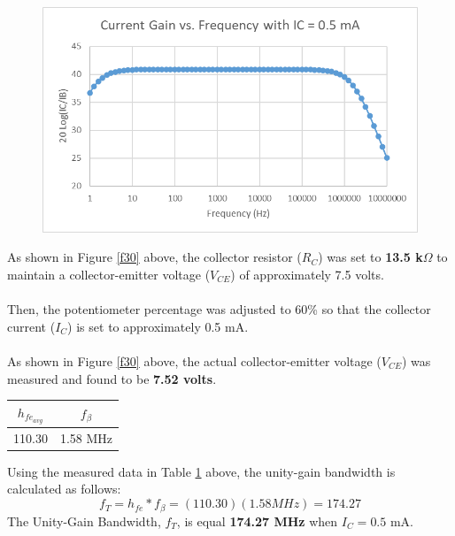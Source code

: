 \documentclass{article}
\begin{document}
	\pagebreak
	
	\begin{figure}[!ht]
		\centering
		\includegraphics[width=0.6\linewidth]{part4-currentGain-0.5ma.png}
		\label{f32}
	\end{figure}
	
	\noindent As shown in Figure \ref{f30} above, the collector resistor ($R_C$) was set to \textbf{13.5 k$\Omega$} to maintain a collector-emitter voltage ($V_{CE}$) of approximately 7.5 volts.\\\\
	Then, the potentiometer percentage was adjusted to 60\% so that the collector current ($I_C$) is set to approximately 0.5 mA.\\\\
	As shown in Figure \ref{f30} above, the actual collector-emitter voltage ($V_{CE}$) was measured and found to be \textbf{7.52 volts}.
	
	\begin{table}[!ht]
		\centering
		\label{t12}
		\begin{tabular}{|c|c|}
			\hline
			$h_{fe_{avg}}$ & $f_{\beta}$\\
			\hline\hline
			110.30 & 1.58 MHz\\
			\hline
		\end{tabular}
	\end{table}	
	
	\noindent Using the measured data in Table \ref{t12} above, the unity-gain bandwidth is calculated as follows:
	$$f_T = h_{fe} * f_{\beta} = (110.30)(1.58 MHz) = 174.27$$
	The Unity-Gain Bandwidth, $f_T$, is equal \textbf{174.27 MHz} when $I_C = 0.5$ mA.	
	
	\pagebreak
	
\end{document}
